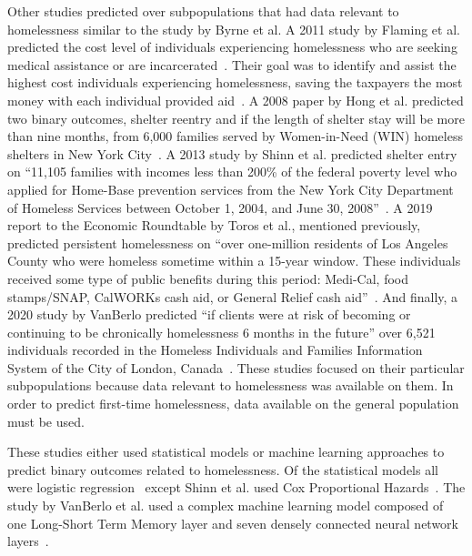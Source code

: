 \documentclass[10pt,letterpaper]{article}
\begin{document}
Other studies predicted over subpopulations that had data relevant to homelessness similar to the study by Byrne et al. A 2011 study by Flaming et al. predicted the cost level of individuals experiencing homelessness who are seeking medical assistance or are incarcerated~\cite{flaming2011crisis}. Their goal was to identify and assist the highest cost individuals experiencing homelessness, saving the taxpayers the most money with each individual provided aid~\cite{flaming2011crisis}. A 2008 paper by Hong et al. predicted two binary outcomes, shelter reentry and if the length of shelter stay will be more than nine months, from 6,000 families served by Women-in-Need (WIN) homeless shelters in New York City~\cite{hong2018applications}. A 2013 study by Shinn et al. predicted shelter entry on ``11,105 families with incomes less than 200\% of the federal poverty level who applied for Home-Base prevention services from the New York City Department of Homeless Services between October 1, 2004, and June 30, 2008''~\cite{shinn2013efficient}. A 2019 report to the Economic Roundtable by Toros et al., mentioned previously, predicted persistent homelessness on ``over one-million residents of Los Angeles County who were homeless sometime within a 15-year window. These individuals received some type of public benefits during this period: Medi-Cal, food stamps/SNAP, CalWORKs cash aid, or General Relief cash aid''~\cite{toros2019early}. And finally, a 2020 study by VanBerlo predicted ``if clients were at risk of becoming or continuing to be chronically homelessness 6 months in the future'' over 6,521 individuals recorded in the Homeless Individuals and Families Information System of the City of London, Canada~\cite{vanberlo2021interpretable}. These studies focused on their particular subpopulations because data relevant to homelessness was available on them. In order to predict first-time homelessness, data available on the general population must be used.

These studies either used statistical models or machine learning approaches to predict binary outcomes related to homelessness. Of the statistical models all were logistic regression~\cite{byrne2020classification,flaming2011crisis,hong2018applications,toros2019early} except Shinn et al. used Cox Proportional Hazards~\cite{shinn2013efficient}. The study by VanBerlo et al. used a complex machine learning model composed of one Long-Short Term Memory layer and seven densely connected neural network layers~\cite{vanberlo2021interpretable}. 
\end{document}
